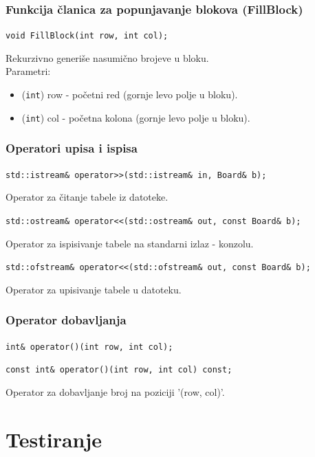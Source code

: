 \documentclass[a4paper]{article}
\begin{document}
    \subsubsection{Funkcija članica za popunjavanje blokova (FillBlock)}
    \texttt{void FillBlock(int row, int col);}
    \par Rekurzivno generiše nasumično brojeve u bloku.\\
    Parametri:
    \begin{itemize}
        \item (\texttt{int}) row - početni red (gornje levo polje u bloku).
        \item (\texttt{int}) col - početna kolona (gornje levo polje u bloku).
    \end{itemize}

    \subsubsection{Operatori upisa i ispisa}
    \par\texttt{std::istream\& operator>>(std::istream\& in, Board\& b);}
    \par Operator za čitanje tabele iz datoteke.
    \par\texttt{std::ostream\& operator<<(std::ostream\& out, const Board\& b);}
    \par Operator za ispisivanje tabele na standarni izlaz - konzolu.
    \par\texttt{std::ofstream\& operator<<(std::ofstream\& out, const Board\& b);}
    \par Operator za upisivanje tabele u datoteku. 

    \subsubsection{Operator dobavljanja}
    \par\texttt{int\& operator()(int row, int col);}
    \par\texttt{const int\& operator()(int row, int col) const;}
    \par Operator za dobavljanje broj na poziciji '(row, col)'.
    
    \newpage
    \section{Testiranje}
\end{document}
